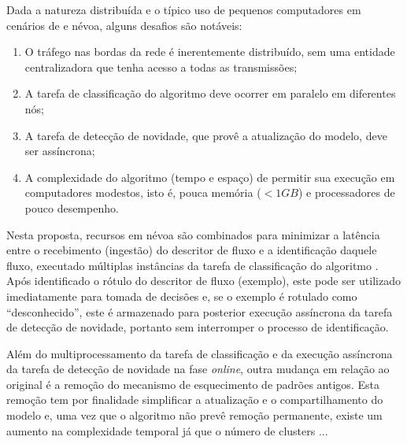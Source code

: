 Dada a natureza distribuída e o típico uso de pequenos computadores em cenários
de \iot e névoa, alguns desafios são notáveis:
\begin{enumerate}[label=(\emph{\roman*})]

  \item O tráfego nas bordas da rede é inerentemente distribuído, sem uma entidade centralizadora que tenha acesso a todas as transmissões;
  
  \item A tarefa de classificação do algoritmo deve ocorrer em paralelo em
  diferentes nós;
  
  \item A tarefa de detecção de novidade, que provê a atualização do modelo,
  deve ser assíncrona;
    
  \item A complexidade do algoritmo (tempo e espaço) de permitir sua execução em
  computadores modestos, isto é, pouca memória ($< 1GB$) e processadores de
  pouco desempenho.

\end{enumerate}

Nesta proposta, recursos em névoa são combinados para minimizar a latência entre
o recebimento (ingestão) do descritor de fluxo e a identificação daquele fluxo,
executado múltiplas instâncias da tarefa de classificação do algoritmo \minas.
Após identificado o rótulo do descritor de fluxo (exemplo), este pode ser
utilizado imediatamente para tomada de decisões e, se o exemplo é rotulado como
``desconhecido'', este é armazenado para posterior execução assíncrona da tarefa
de detecção de novidade, portanto sem interromper o processo de identificação.

Além do multiprocessamento da tarefa de classificação e da execução assíncrona da
tarefa de detecção de novidade na fase \emph{online}, outra mudança em relação
ao \minas original é a remoção do mecanismo de esquecimento de padrões antigos.
Esta remoção tem por finalidade
simplificar a atualização e o compartilhamento do modelo e, uma vez que o
algoritmo \minas não prevê remoção permanente, existe um aumento na complexidade
temporal já que o número de clusters ... %

